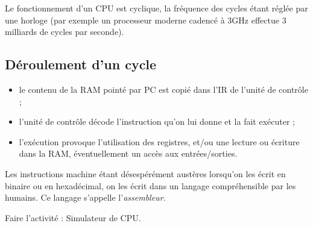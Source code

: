 Le fonctionnement d'un CPU est cyclique, la fréquence des cycles étant réglée par une horloge (par exemple un processeur moderne cadencé à 3GHz effectue 3 milliards de cycles par seconde).

\subsection*{Déroulement d'un cycle}

\begin{itemize}
    \item 	le contenu de la RAM pointé par PC est copié dans l'IR de l'unité de contrôle ;
    \item 	l'unité de contrôle décode l'instruction qu'on lui donne et la fait exécuter ;
    \item 	l'exécution provoque l'utilisation des registres, et/ou une lecture ou écriture dans la RAM, éventuellement un accès aux entrées/sorties.
\end{itemize}

Les instructions machine étant \og désespérément austères\fg{} lorsqu'on les écrit en binaire ou en hexadécimal, on les écrit dans un langage compréhensible par les humains. Ce langage s'appelle l'\textit{assembleur}.

\begin{exercice}[]
    Faire l'activité : Simulateur de CPU.
\end{exercice}